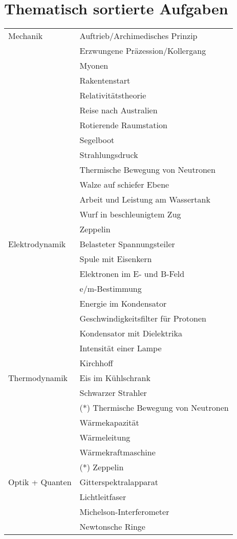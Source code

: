 \documentclass[a4paper]{scrartcl}
\begin{document}
\section{Thematisch sortierte Aufgaben}

\begin{longtable}{ll}
  Mechanik & Auftrieb/Archimedisches Prinzip \\
  & Erzwungene Präzession/Kollergang\\
  & Myonen\\
  & Rakentenstart\\
  & Relativitätstheorie\\
  & Reise nach Australien\\
  & Rotierende Raumstation\\
  & Segelboot\\
  & Strahlungsdruck \\
  & Thermische Bewegung von Neutronen\\
  & Walze auf schiefer Ebene\\
  & Arbeit und Leistung am Wassertank\\
  & Wurf in beschleunigtem Zug\\
  & Zeppelin\\
  Elektrodynamik & Belasteter Spannungsteiler\\
  & Spule mit Eisenkern\\
  & Elektronen im E- und B-Feld\\
  & e/m-Bestimmung\\
  & Energie im Kondensator\\
  & Geschwindigkeitsfilter für Protonen\\
  & Kondensator mit Dielektrika\\
  & Intensität einer Lampe\\
  & Kirchhoff\\
  Thermodynamik & Eis im Kühlschrank \\
  & Schwarzer Strahler\\
  & (*) Thermische Bewegung von Neutronen\\
  & Wärmekapazität\\
  & Wärmeleitung\\
  & Wärmekraftmaschine\\
  & (*) Zeppelin\\
  Optik + Quanten & Gitterspektralapparat \\
  & Lichtleitfaser \\
  & Michelson-Interferometer \\
  & Newtonsche Ringe \\

\end{longtable}
\end{document}

